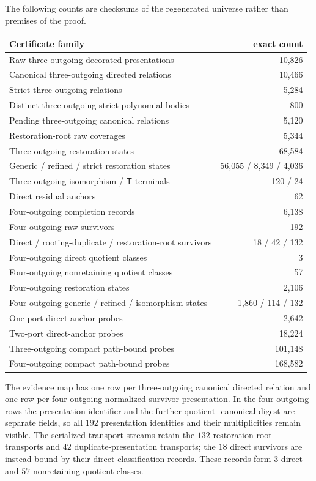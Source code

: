 \documentclass[11pt]{article}
\newcommand{\Tmove}{\mathsf T}
\begin{document}
The following counts are checksums of the regenerated universe rather than
premises of the proof.

\begin{longtable}{>{\raggedright\arraybackslash}p{.50\linewidth}r}
\toprule
Certificate family & exact count\\
\midrule
\endhead
Raw three-outgoing decorated presentations & 10,826\\
Canonical three-outgoing directed relations & 10,466\\
Strict three-outgoing relations & 5,284\\
Distinct three-outgoing strict polynomial bodies & 800\\
Pending three-outgoing canonical relations & 5,120\\
Restoration-root raw coverages & 5,344\\
Three-outgoing restoration states & 68,584\\
Generic / refined / strict restoration states & 56,055 / 8,349 / 4,036\\
Three-outgoing isomorphism / $\Tmove$ terminals & 120 / 24\\
Direct residual anchors & 62\\
Four-outgoing completion records & 6,138\\
Four-outgoing raw survivors & 192\\
Direct / rooting-duplicate / restoration-root survivors & 18 / 42 / 132\\
Four-outgoing direct quotient classes & 3\\
Four-outgoing nonretaining quotient classes & 57\\
Four-outgoing restoration states & 2,106\\
Four-outgoing generic / refined / isomorphism states & 1,860 / 114 / 132\\
One-port direct-anchor probes & 2,642\\
Two-port direct-anchor probes & 18,224\\
Three-outgoing compact path-bound probes & 101,148\\
Four-outgoing compact path-bound probes & 168,582\\
\bottomrule
\end{longtable}

The evidence map has one row per three-outgoing canonical directed relation
and one row per four-outgoing normalized survivor presentation.  In the
four-outgoing rows the presentation identifier and the further quotient-
canonical digest are separate fields, so all $192$ presentation identities
and their multiplicities remain visible.  The serialized transport streams
retain the $132$ restoration-root transports and $42$ duplicate-presentation
transports; the $18$ direct survivors are instead bound by their direct
classification records.  These records form $3$ direct and $57$
nonretaining quotient classes.
\end{document}
